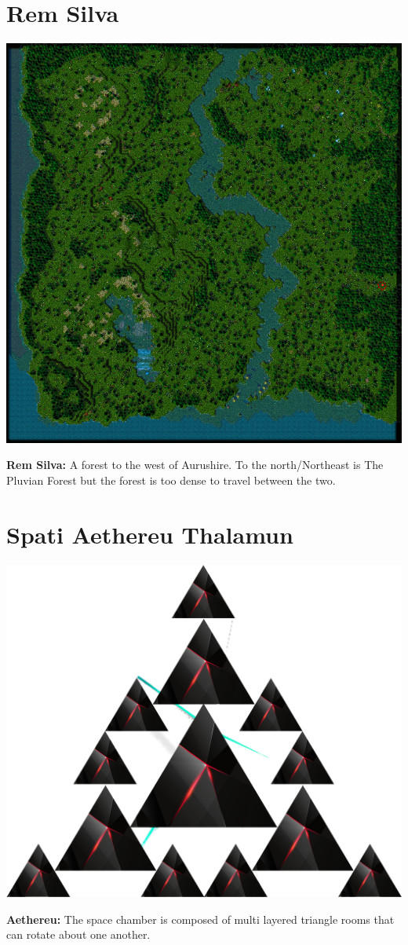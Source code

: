 \section{Rem Silva}
\begin{center}
	\includegraphics[width=\linewidth]{img/RemSilva.png}
	
	{\textbf{Rem Silva:} A forest to the west of Aurushire. To the north/Northeast is The Pluvian Forest but the forest is too dense to travel between the two.}
\end{center}

\section{Spati Aethereu Thalamun}
\begin{center}
	\includegraphics[width=0.5\linewidth]{img/Aethereu.png}	
	
	{\textbf{Aethereu:} The space chamber is composed of multi layered triangle rooms that can rotate about one another.}
\end{center}

